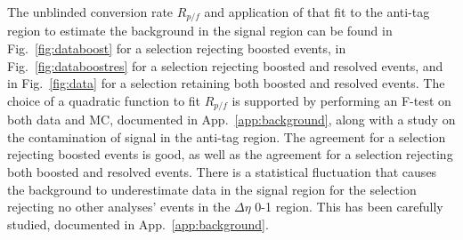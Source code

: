 The unblinded conversion rate $R_{p/f}$ and application of that fit to the anti-tag region to estimate the background in the signal region can be found in Fig.~\ref{fig:databoost} for a selection rejecting boosted events, in Fig.~\ref{fig:databoostres} for a selection rejecting boosted and resolved events, and in Fig.~\ref{fig:data} for a selection retaining both boosted and resolved events. The choice of a quadratic function to fit $R_{p/f}$ is supported by performing an F-test on both data and MC, documented in App.~\ref{app:background}, along with a study on the contamination of signal in the anti-tag region. The agreement for a selection rejecting boosted events is good, as well as the agreement for a selection rejecting both boosted and resolved events. There is a statistical fluctuation that causes the background to underestimate data in the signal region for the selection rejecting no other analyses' events in the $\Delta\eta$ 0-1 region. This has been carefully studied, documented in App.~\ref{app:background}.

